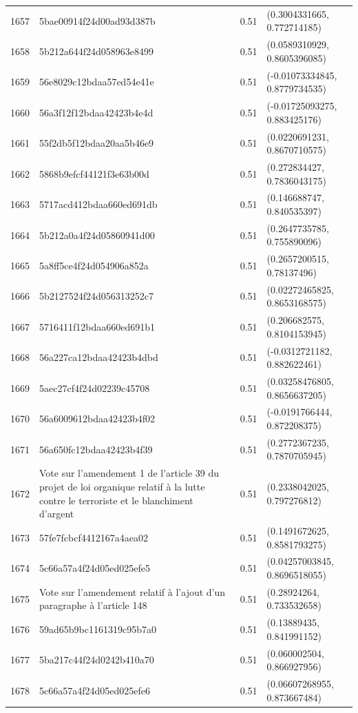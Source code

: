 \begin{table}[ht]
\begin{tabular}{rlrl}
  1657 & 5bae00914f24d00ad93d387b & 0.51 & (0.3004331665, 0.772714185) \\ 
  1658 & 5b212a644f24d058963e8499 & 0.51 & (0.0589310929, 0.8605396085) \\ 
  1659 & 56e8029c12bdaa57ed54e41e & 0.51 & (-0.01073334845, 0.8779734535) \\ 
  1660 & 56a3f12f12bdaa42423b4e4d & 0.51 & (-0.01725093275, 0.883425176) \\ 
  1661 & 55f2db5f12bdaa20aa5b46e9 & 0.51 & (0.0220691231, 0.8670710575) \\ 
  1662 & 5868b9efcf44121f3e63b00d & 0.51 & (0.272834427, 0.7836043175) \\ 
  1663 & 5717acd412bdaa660ed691db & 0.51 & (0.146688747, 0.840535397) \\ 
  1664 & 5b212a0a4f24d05860941d00 & 0.51 & (0.2647735785, 0.755890096) \\ 
  1665 & 5a8ff5ce4f24d054906a852a & 0.51 & (0.2657200515, 0.78137496) \\ 
  1666 & 5b2127524f24d056313252c7 & 0.51 & (0.02272465825, 0.8653168575) \\ 
  1667 & 5716411f12bdaa660ed691b1 & 0.51 & (0.206682575, 0.8104153945) \\ 
  1668 & 56a227ca12bdaa42423b4dbd & 0.51 & (-0.0312721182, 0.882622461) \\ 
  1669 & 5aec27cf4f24d02239c45708 & 0.51 & (0.03258476805, 0.8656637205) \\ 
  1670 & 56a6009612bdaa42423b4f02 & 0.51 & (-0.0191766444, 0.872208375) \\ 
  1671 & 56a650fc12bdaa42423b4f39 & 0.51 & (0.2772367235, 0.7870705945) \\ 
  1672 & Vote sur l'amendement 1 de l'article 39 du projet de loi organique relatif à la lutte contre le terroriste et le blanchiment d'argent & 0.51 & (0.2338042025, 0.797276812) \\ 
  1673 & 57fe7fcbcf4412167a4aea02 & 0.51 & (0.1491672625, 0.8581793275) \\ 
  1674 & 5c66a57a4f24d05ed025efe5 & 0.51 & (0.04257003845, 0.8696518055) \\ 
  1675 & Vote sur l'amendement relatif à l'ajout d'un paragraphe à l'article 148 & 0.51 & (0.28924264, 0.733532658) \\ 
  1676 & 59ad65b9bc1161319c95b7a0 & 0.51 & (0.13889435, 0.841991152) \\ 
  1677 & 5ba217c44f24d0242b410a70 & 0.51 & (0.060002504, 0.866927956) \\ 
  1678 & 5c66a57a4f24d05ed025efe6 & 0.51 & (0.06607268955, 0.873667484) \\ 

\end{tabular}
\end{table}
